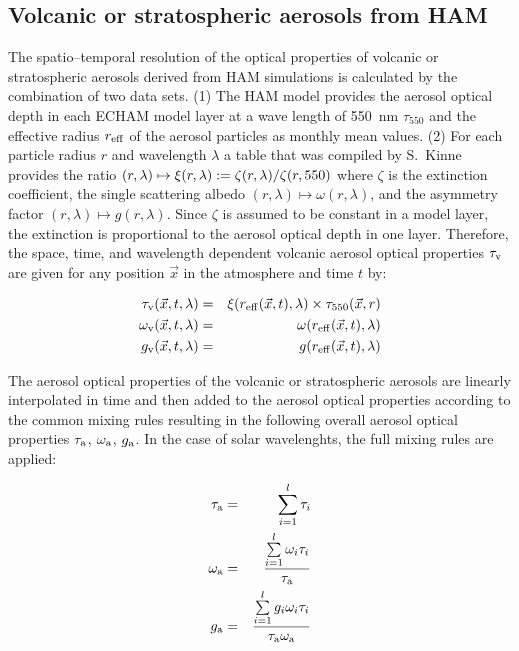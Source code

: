 \begin{appendix}
\subsection{Volcanic or stratospheric aerosols from HAM}

The spatio--temporal resolution of the optical properties of volcanic
or stratospheric aerosols derived from HAM simulations is calculated
by the combination of two data sets. (1) The HAM model provides the
aerosol optical depth in each ECHAM model layer at a wave length of
550~nm $\tau_{550}$ and the effective radius $r_{\rm eff}$ of the
aerosol particles as monthly mean values. (2) For each particle radius
$r$ and wavelength 
$\lambda$ a table that was
compiled by
S.~Kinne provides the ratio
$(r,\lambda)\mapsto\xi(r,\lambda):=\zeta(r,\lambda)/\zeta(r,550{\rm})$
where $\zeta$ is the extinction coefficient, the single scattering
albedo $(r,\lambda)\mapsto\omega(r,\lambda)$, and the
asymmetry factor $(r,\lambda)\mapsto g(r,\lambda)$. Since
$\zeta$ is assumed 
to be constant in a model layer, the extinction is proportional to the
aerosol optical depth in one layer. Therefore, the space, time, and
wavelength dependent volcanic aerosol optical properties $\tau_{\rm
  v}$ are given for any position 
$\vec{x}$ in the atmosphere and time $t$ by:

\begin{eqnarray}\label{eqtau}
\tau_{\rm v}(\vec{x},t,\lambda)&=&\xi(r_{\rm
eff}(\vec{x},t),\lambda)\times\tau_{550}(\vec{x},r) \\\label{eqssa}
\omega_{\rm v}(\vec{x},t,\lambda)&=&\omega(r_{\rm
eff}(\vec{x},t),\lambda) \\\label{eqasy}
g_{\rm v}(\vec{x},t,\lambda)&=&g(r_{\rm
eff}(\vec{x},t),\lambda) 
\end{eqnarray}

The aerosol optical properties of the volcanic or stratospheric
aerosols are linearly interpolated in time and then added to the
aerosol optical properties according to the common mixing rules
resulting in the following overall aerosol optical properties
$\tau_{\rm a}$, $\omega_{\rm a}$, $g_{\rm a}$. In the case of solar
wavelenghts, the full mixing rules are applied:

\begin{eqnarray}\label{eqm1}
\tau_{\rm a}&=&\sum\limits_{i=1}^l \tau_i\\\label{eqm2}
\omega_{\rm a}&=&\frac{\sum\limits_{i=1}^l \omega_i\tau_i}{\tau_{\rm a}}\\\label{eqm3}
g_{\rm a}&=&\frac{\sum\limits_{i=1}^l g_i\omega_i\tau_i}{\tau_{\rm
    a}\omega_{\rm a}}
\end{eqnarray}


\end{appendix}
